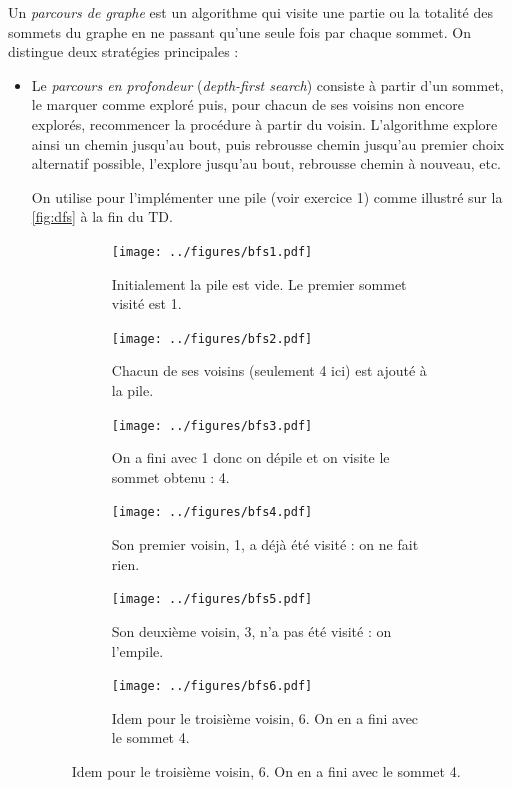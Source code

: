 \documentclass{article}
\begin{document}
Un \emph{parcours de graphe} est un algorithme qui visite une partie ou la totalité des sommets du graphe en ne passant qu'une seule fois par chaque sommet. On distingue deux stratégies principales :
\begin{itemize}
	\item Le \emph{parcours en profondeur} (\textit{depth-first search}) consiste à partir d'un sommet, le marquer comme exploré puis, pour chacun de ses voisins non encore explorés, recommencer la procédure à partir du voisin. L'algorithme explore ainsi un chemin jusqu'au bout, puis rebrousse chemin jusqu'au premier choix alternatif possible, l'explore jusqu'au bout, rebrousse chemin à nouveau, etc.
	
	On utilise pour l'implémenter une pile (voir exercice 1) comme illustré sur la \autoref{fig:dfs} à la fin du TD.
	
	\begin{figure}[b]
		\caption{Illustration d'un parcours en profondeur commençant par le sommet 1}\label{fig:dfs}
		\begin{subfigure}[t]{0.3\linewidth}
			\centering
			\texttt{[image: ../figures/bfs1.pdf]}
			\caption{Initialement la pile est vide. Le premier sommet visité est 1.}
		\end{subfigure}\hfill%
		\begin{subfigure}[t]{0.3\linewidth}
			\centering
			\texttt{[image: ../figures/bfs2.pdf]}
			\caption{Chacun de ses voisins (seulement 4 ici) est ajouté à la pile.}
		\end{subfigure}\hfill%
		\begin{subfigure}[t]{0.3\linewidth}
			\centering
			\texttt{[image: ../figures/bfs3.pdf]}
			\caption{On a fini avec 1 donc on dépile et on visite le sommet obtenu : 4.}
		\end{subfigure}
		
		\begin{subfigure}[t]{0.3\linewidth}
			\centering
			\texttt{[image: ../figures/bfs4.pdf]}
			\caption{Son premier voisin, 1, a déjà été visité : on ne fait rien.}
		\end{subfigure}\hfill%
		\begin{subfigure}[t]{0.3\linewidth}
			\centering
			\texttt{[image: ../figures/bfs5.pdf]}
			\caption{Son deuxième voisin, 3, n'a pas été visité : on l'empile.}
		\end{subfigure}\hfill%
		\begin{subfigure}[t]{0.3\linewidth}
			\centering
			\texttt{[image: ../figures/bfs6.pdf]}
			\caption{Idem pour le troisième voisin, 6. On en a fini avec le sommet 4.}
		\end{subfigure}
		

\end{figure}
\end{itemize}
\end{document}
